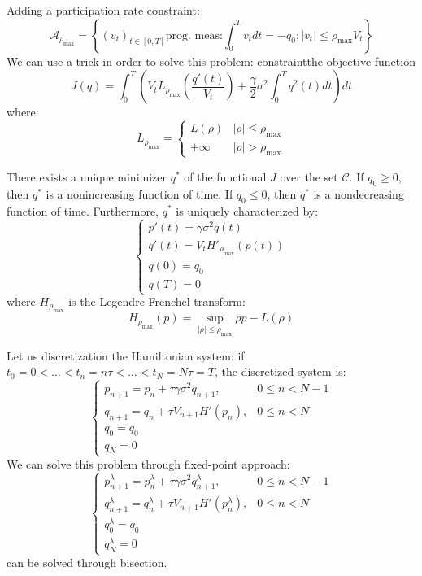 Adding a participation rate constraint:
\[
\mathcal{A}_{\rho_\text{max}} = \left\{(v_t)_{t \in [0,T]} \text{prog. meas:} \int_{0}^{T} v_t dt = -q_0; |v_t| \leq \rho_{\max}V_t\right\}
\]
We can use a trick in order to solve this problem: constraintthe objective function
\[
J(q) = \int_{0}^{T} \left(V_tL_{\rho_{\max}}\left(\frac{q'(t)}{V_t}\right) + \frac{\gamma}{2} \sigma^2 \int_0^T q^2(t) dt\right) dt 
\]
where:
\[
L_{\rho_{\max}} = \begin{cases}
	 L(\rho) & |\rho| \leq \rho_{\max}\\
	+\infty & |\rho| > \rho_{\max}
\end{cases}
\]
\begin{mytheorem}
	There exists a unique minimizer $q^*$ of the functional $J$ over the set $\mathcal{C}$. If $q_0 \geq 0$, then $q^*$ is a nonincreasing function of time. If $q_0\leq 0$, then $q^*$ is a nondecreasing function of time. Furthermore, $q^*$ is uniquely characterized by:
	\[
	\begin{cases*}
		p'(t) = \gamma \sigma^2 q(t) 	\\
		q'(t) = V_t H'_{\rho_{\max}}(p(t))\\
		q(0) = q_0\\
		q(T) = 0 
	\end{cases*}
	\]
where $H_{\rho_{\max}}$ is the Legendre-Frenchel transform:
\[
H_{\rho_{\max}}(p) = \sup_{|\rho| \leq \rho_{\max}} \rho p - L(\rho)
\]
\end{mytheorem}
Let us discretization the Hamiltonian system: if $t_0 = 0 < \ldots < t_n = n\tau < \ldots<t_N = N\tau = T$, the discretized system is:
\[
\begin{cases}
	p_{n+1} = p_n + \tau \gamma \sigma^2 q_{n+1}, & 0\leq n<N-1\\
	q_{n+1} = q_n + \tau V_{n+1}H'(p_n), & 0 \leq n<N\\
	q_0 = q_0\\
	q_N = 0
\end{cases}
\]
We can solve this problem through fixed-point approach:
\[
\begin{cases}
	p_{n+1}^{\lambda} = p_n^{\lambda} + \tau \gamma \sigma^2 q_{n+1}^{\lambda}, & 0\leq n<N-1\\
	q_{n+1}^{\lambda} = q_n^{\lambda} + \tau V_{n+1}H'(p_n^{\lambda}), & 0 \leq n<N\\
	q_0^{\lambda} = q_0\\
	q_N^{\lambda} = 0
\end{cases}
\]
can be solved through bisection.
\newpage
